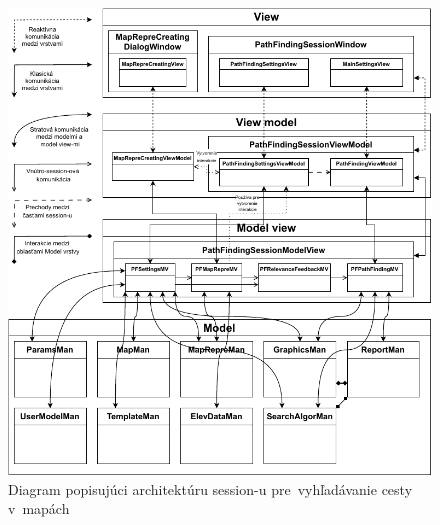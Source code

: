\begin{figure}[h]\centering
\includegraphics[]{img/session_vyhladavania_cesty}
\caption{Diagram popisujúci architektúru session-u pre~vyhľadávanie cesty v~mapách} 
\label{obr04:session_vyhladavania_cesty}
\end{figure}

